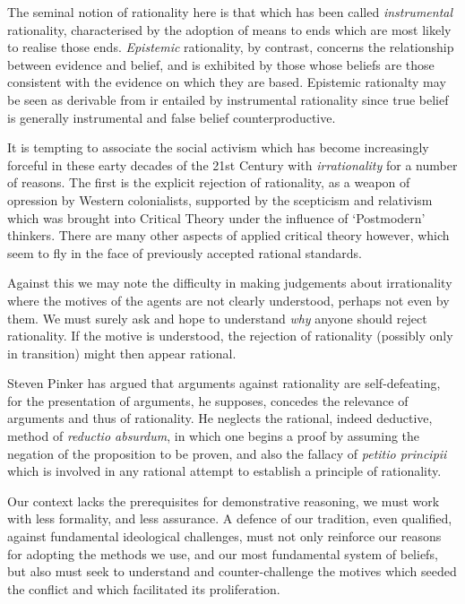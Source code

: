 \documentclass[10pt,titlepage]{book}
\begin{document}
The seminal notion of rationality here is that which has been called \emph{instrumental} rationality, characterised by the adoption of means to ends which are most likely to realise those ends.
\emph{Epistemic} rationality, by contrast, concerns the relationship between evidence and belief, and is exhibited by those whose beliefs are those consistent with the evidence on which they are based.
Epistemic rationalty may be seen as derivable from ir entailed by instrumental rationality since true belief is generally instrumental and false belief counterproductive.

It is tempting to associate the social activism which has become increasingly forceful in these earty decades of the 21st Century with \emph{irrationality} for a number of reasons.
The first is the explicit rejection of rationality, as a weapon of opression by Western colonialists, supported by the scepticism and relativism which was brought into Critical Theory under the influence of `Postmodern' thinkers.
There are many other aspects of applied critical theory however, which seem to fly in the face of previously accepted rational standards.

Against this we may note the difficulty in making judgements about irrationality where the motives of the agents are not clearly understood, perhaps not even by them.
We must surely ask and hope to understand \emph{why} anyone should reject rationality.
If the motive is understood, the rejection of rationality (possibly only in transition) might then appear rational.

Steven Pinker has argued that arguments against rationality are self-defeating, for the presentation of arguments, he supposes, concedes the relevance of arguments and thus of rationality.
He neglects the rational, indeed deductive, method of \emph{reductio absurdum}, in which one begins a proof by assuming the negation of the proposition to be proven, and also the fallacy of \emph{petitio principii} which is involved in any rational attempt to establish a principle of rationality.

Our context lacks the prerequisites for demonstrative reasoning, we must work with less formality, and less assurance.
A defence of our tradition, even qualified, against fundamental ideological challenges, must not only reinforce our reasons for adopting the methods we use, and our most fundamental system of beliefs, but also must seek to understand and counter-challenge the motives which seeded the conflict and which facilitated its proliferation.
\end{document}
